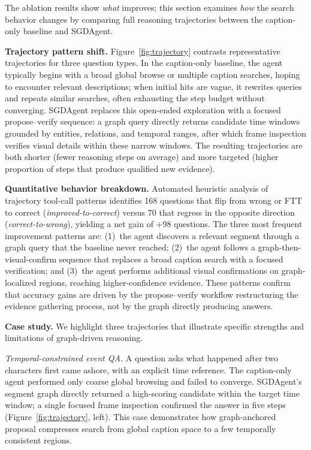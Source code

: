 \documentclass[sigconf, screen, review, anonymous]{acmart}
\begin{document}
The ablation results show \emph{what} improves; this section examines
\emph{how} the search behavior changes by comparing full reasoning
trajectories between the caption-only baseline and SGDAgent.

\textbf{Trajectory pattern shift.}\quad
Figure~\ref{fig:trajectory} contrasts representative trajectories for
three question types.  In the caption-only baseline, the agent typically
begins with a broad global browse or multiple caption searches, hoping
to encounter relevant descriptions; when initial hits are vague, it
rewrites queries and repeats similar searches, often exhausting the step
budget without converging.  SGDAgent replaces this open-ended exploration
with a focused propose--verify sequence: a graph query directly returns
candidate time windows grounded by entities, relations, and temporal
ranges, after which frame inspection verifies visual details within these
narrow windows.  The resulting trajectories are both shorter (fewer
reasoning steps on average) and more targeted (higher proportion of steps
that produce qualified new evidence).

\textbf{Quantitative behavior breakdown.}\quad
Automated heuristic analysis of trajectory tool-call patterns identifies
168 questions that flip from wrong or FTT to correct
(\emph{improved-to-correct}) versus 70 that regress in the opposite
direction (\emph{correct-to-wrong}), yielding a net gain of +98
questions.  The three most frequent improvement patterns are:
(1)~the agent discovers a relevant segment through a graph query that the
baseline never reached;
(2)~the agent follows a graph-then-visual-confirm sequence that replaces
a broad caption search with a focused verification;
and (3)~the agent performs additional visual confirmations on
graph-localized regions, reaching higher-confidence evidence.
These patterns confirm that accuracy gains are driven by the
propose--verify workflow restructuring the evidence gathering process,
not by the graph directly producing answers.

\textbf{Case study.}\quad
We highlight three trajectories that illustrate specific strengths and
limitations of graph-driven reasoning.

\emph{Temporal-constrained event QA.}\quad
A question asks what happened after two characters first came ashore,
with an explicit time reference.  The caption-only agent performed only
coarse global browsing and failed to converge.  SGDAgent's segment graph
directly returned a high-scoring candidate within the target time window;
a single focused frame inspection confirmed the answer in five steps
(Figure~\ref{fig:trajectory}, left).  This case demonstrates how
graph-anchored proposal compresses search from global caption space to a
few temporally consistent regions.
\end{document}

